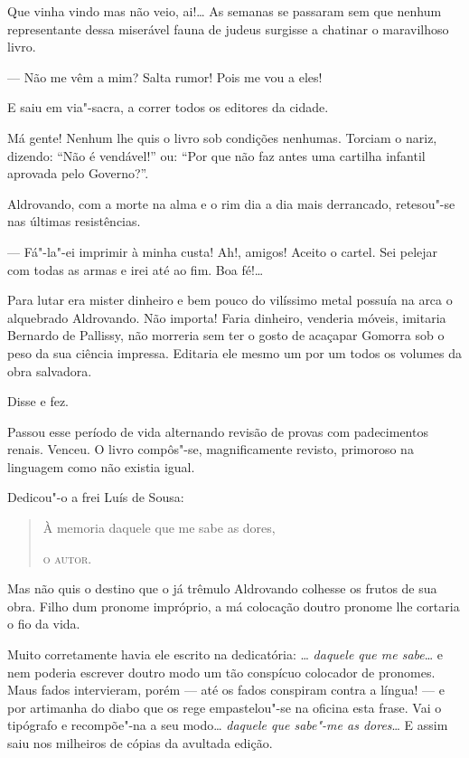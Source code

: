 Que vinha vindo mas não veio, ai!\ldots{} As semanas se passaram sem que
nenhum representante dessa miserável fauna de judeus surgisse a chatinar
o maravilhoso livro.

--- Não me vêm a mim? Salta rumor! Pois me vou a eles!

E saiu em via"-sacra, a correr todos os editores da cidade.

Má gente! Nenhum lhe quis o livro sob condições nenhumas. Torciam o
nariz, dizendo: ``Não é vendável!'' ou: ``Por que não faz antes uma
cartilha infantil aprovada pelo Governo?''.

Aldrovando, com a morte na alma e o rim dia a dia mais derrancado,
retesou"-se nas últimas resistências.

--- Fá"-la"-ei imprimir à minha custa! Ah!, amigos! Aceito o cartel. Sei
pelejar com todas as armas e irei até ao fim. Boa fé!\ldots{}

Para lutar era mister dinheiro e bem pouco do vilíssimo metal possuía na
arca o alquebrado Aldrovando. Não importa! Faria dinheiro, venderia
móveis, imitaria Bernardo de Pallissy, não morreria sem ter o gosto de
acaçapar Gomorra sob o peso da sua ciência impressa. Editaria ele mesmo
um por um todos os volumes da obra salvadora.

Disse e fez.

Passou esse período de vida alternando revisão de provas com
padecimentos renais. Venceu. O livro compôs"-se, magnificamente revisto,
primoroso na linguagem como não existia igual.

Dedicou"-o a frei Luís de Sousa:

\begin{quote}
À memoria daquele que me sabe as dores,

\textsc{o autor.}
\end{quote}

Mas não quis o destino que o já trêmulo Aldrovando colhesse os frutos de
sua obra. Filho dum pronome impróprio, a má colocação doutro pronome lhe
cortaria o fio da vida.

Muito corretamente havia ele escrito na dedicatória: \ldots{} \emph{daquele
que me sabe}\ldots{} e nem poderia escrever doutro modo um tão conspícuo
colocador de pronomes. Maus fados intervieram, porém --- até os fados
conspiram contra a língua! --- e por artimanha do diabo que os rege
empastelou"-se na oficina esta frase. Vai o tipógrafo e recompõe"-na a seu
modo\ldots{} \emph{daquele que sabe"-me as dores}\ldots{} E assim saiu nos
milheiros de cópias da avultada edição.

